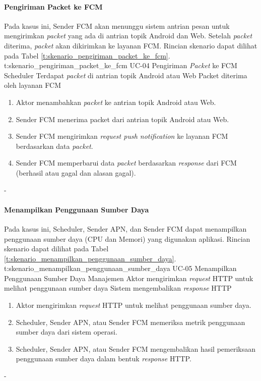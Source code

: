 \paragraph{Pengiriman Packet ke FCM}
\par Pada kasus ini, Sender FCM akan menunggu sistem antrian pesan untuk mengirimkan \textit{packet} yang ada di antrian topik Android dan Web. Setelah \textit{packet} diterima, \textit{packet} akan dikirimkan ke layanan FCM. Rincian skenario dapat dilihat pada Tabel \ref{t:skenario_pengiriman_packet_ke_fcm}.
\tableUcDesc
{t:skenario_pengiriman_packet_ke_fcm}
{UC-04}
{Pengiriman \textit{Packet} ke FCM}
{Scheduler}
{Terdapat \textit{packet} di antrian topik Android atau Web}
{Packet diterima oleh layanan FCM}
{
\begin{enumerate}
	\item Aktor menambahkan \textit{packet} ke antrian topik Android atau Web.
    \item Sender FCM menerima packet dari antrian topik Android atau Web.
    \item Sender FCM mengirimkan \textit{request push notification} ke layanan FCM berdasarkan data \textit{packet}.
    \item Sender FCM memperbarui data \textit{packet} berdasarkan \textit{response} dari FCM (berhasil atau gagal dan alasan gagal).
\end{enumerate}
}
{-}

\paragraph{Menampilkan Penggunaan Sumber Daya}
\par Pada kasus ini, Scheduler, Sender APN, dan Sender FCM dapat menampilkan penggunaan sumber daya (CPU dan Memori) yang digunakan aplikasi. Rincian skenario dapat dilihat pada Tabel \ref{t:skenario_menampilkan_penggunaan_sumber_daya}.
\tableUcDesc
{t:skenario_menampilkan_penggunaan_sumber_daya}
{UC-05}
{Menampilkan Penggunaan Sumber Daya}
{Manajemen}
{Aktor mengirimkan \textit{request} HTTP untuk melihat penggunaan sumber daya}
{Sistem mengembalikan \textit{response} HTTP}
{
\begin{enumerate}
	\item Aktor mengirimkan \textit{request} HTTP untuk melihat penggunaan sumber daya.
	\item Scheduler, Sender APN, atau Sender FCM memeriksa metrik penggunaan sumber daya dari sistem operasi.
	\item Scheduler, Sender APN, atau Sender FCM mengembalikan hasil pemeriksaan penggunaan sumber daya dalam bentuk \textit{response} HTTP.
\end{enumerate}
}
{-}

